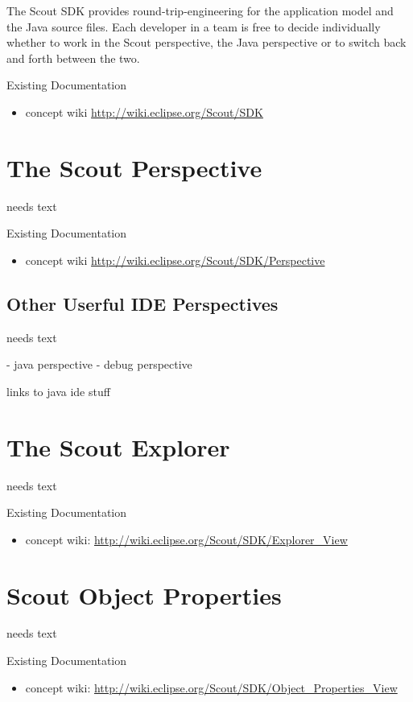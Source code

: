 \documentclass[a4paper,10pt,twoside]{book}
\begin{document}
The Scout SDK provides round-trip-engineering for the application model and the Java source files. Each developer
in a team is free to decide individually whether to work in the Scout perspective, the Java perspective or to switch
back and forth between the two.

\noindent Existing Documentation
\begin{itemize}
  \item concept wiki \url{http://wiki.eclipse.org/Scout/SDK}
\end{itemize}

\section{The Scout Perspective}
needs text

\noindent Existing Documentation
\begin{itemize}
  \item concept wiki \url{http://wiki.eclipse.org/Scout/SDK/Perspective}
\end{itemize}

\subsection{Other Userful IDE Perspectives}
needs text

- java perspective
- debug perspective

links to java ide stuff

\section{The Scout Explorer}
needs text

\noindent Existing Documentation
\begin{itemize}
  \item concept wiki: \url{http://wiki.eclipse.org/Scout/SDK/Explorer_View}
\end{itemize}

\section{Scout Object Properties}
needs text

\noindent Existing Documentation
\begin{itemize}
  \item concept wiki: \url{http://wiki.eclipse.org/Scout/SDK/Object_Properties_View}
\end{itemize}
\end{document}

